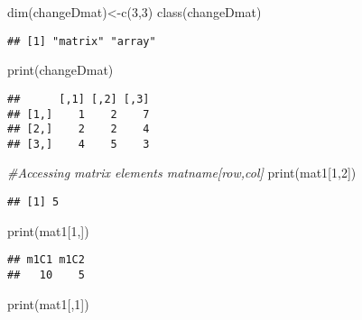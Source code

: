 \documentclass[
]{article}
\newenvironment{Shaded}{\begin{snugshade}}{\end{snugshade}}
\newcommand{\CommentTok}[1]{\textcolor[rgb]{0.56,0.35,0.01}{\textit{#1}}}
\newcommand{\DecValTok}[1]{\textcolor[rgb]{0.00,0.00,0.81}{#1}}
\newcommand{\FunctionTok}[1]{\textcolor[rgb]{0.00,0.00,0.00}{#1}}
\newcommand{\NormalTok}[1]{#1}
\newcommand{\OtherTok}[1]{\textcolor[rgb]{0.56,0.35,0.01}{#1}}
\begin{document}
\begin{Shaded}
\begin{Highlighting}[]
\FunctionTok{dim}\NormalTok{(changeDmat)}\OtherTok{\textless{}{-}}\FunctionTok{c}\NormalTok{(}\DecValTok{3}\NormalTok{,}\DecValTok{3}\NormalTok{)}
\FunctionTok{class}\NormalTok{(changeDmat)}
\end{Highlighting}
\end{Shaded}

\begin{verbatim}
## [1] "matrix" "array"
\end{verbatim}

\begin{Shaded}
\begin{Highlighting}[]
\FunctionTok{print}\NormalTok{(changeDmat)}
\end{Highlighting}
\end{Shaded}

\begin{verbatim}
##      [,1] [,2] [,3]
## [1,]    1    2    7
## [2,]    2    2    4
## [3,]    4    5    3
\end{verbatim}

\begin{Shaded}
\begin{Highlighting}[]
\CommentTok{\#Accessing matrix elements matname[row,col]}
\FunctionTok{print}\NormalTok{(mat1[}\DecValTok{1}\NormalTok{,}\DecValTok{2}\NormalTok{])}
\end{Highlighting}
\end{Shaded}

\begin{verbatim}
## [1] 5
\end{verbatim}

\begin{Shaded}
\begin{Highlighting}[]
\FunctionTok{print}\NormalTok{(mat1[}\DecValTok{1}\NormalTok{,])}
\end{Highlighting}
\end{Shaded}

\begin{verbatim}
## m1C1 m1C2 
##   10    5
\end{verbatim}

\begin{Shaded}
\begin{Highlighting}[]
\FunctionTok{print}\NormalTok{(mat1[,}\DecValTok{1}\NormalTok{])}
\end{Highlighting}
\end{Shaded}
\end{document}
